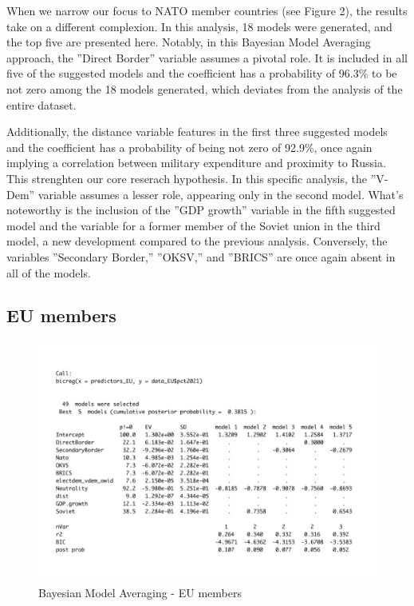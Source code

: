 \documentclass[12pt,a4paper]{article}
\begin{document}
When we narrow our focus to NATO member countries (see Figure 2), the results take on a different complexion. In this analysis, 18 models were generated, and the top five are presented here. Notably, in this Bayesian Model Averaging approach, the ''Direct Border'' variable assumes a pivotal role. It is included in all five of the suggested models and the coefficient has a probability of 96.3\% to be not zero among the 18 models generated, which deviates from the analysis of the entire dataset.

Additionally, the distance variable features in the first three suggested models and the coefficient has a probability of being not zero of 92.9\%, once again implying a correlation between military expenditure and proximity to Russia. This strenghten our core reserach hypothesis. In this specific analysis, the ''V-Dem'' variable assumes a lesser role, appearing only in the second model. What's noteworthy is the inclusion of the ''GDP growth'' variable in the fifth suggested model and the variable for a former member of the Soviet union in the third model, a new development compared to the previous analysis. Conversely, the variables ''Secondary Border,'' ''OKSV,'' and ''BRICS'' are once again absent in all of the models. \\


\subsection{EU members}
\begin{figure}[h]
\center
\label{F:1}
\includegraphics[scale=0.5]{BMA_EU}
\caption{Bayesian Model Averaging - EU members}
\end{figure}
\end{document}
